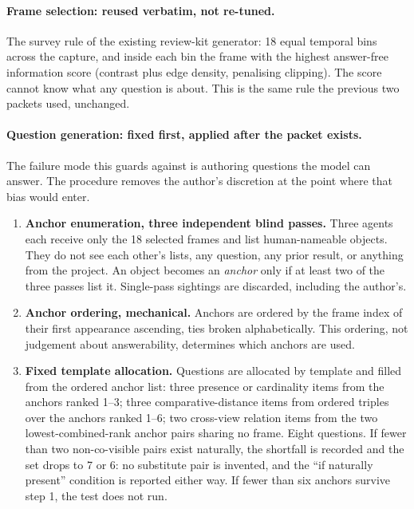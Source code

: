 \paragraph{Frame selection: reused verbatim, not re-tuned.} The survey
rule of the existing review-kit generator: 18 equal temporal bins across the
capture, and inside each bin the frame with the highest answer-free
information score (contrast plus edge density, penalising clipping). The
score cannot know what any question is about. This is the same rule the
previous two packets used, unchanged.

\paragraph{Question generation: fixed first, applied after the packet
exists.} The failure mode this guards against is authoring questions the
model can answer. The procedure removes the author's discretion at the point
where that bias would enter.

\begin{enumerate}
  \item \textbf{Anchor enumeration, three independent blind passes.} Three
  agents each receive only the 18 selected frames and list human-nameable
  objects. They do not see each other's lists, any question, any prior
  result, or anything from the project. An object becomes an \emph{anchor}
  only if at least two of the three passes list it. Single-pass sightings
  are discarded, including the author's.
  \item \textbf{Anchor ordering, mechanical.} Anchors are ordered by the
  frame index of their first appearance ascending, ties broken
  alphabetically. This ordering, not judgement about answerability,
  determines which anchors are used.
  \item \textbf{Fixed template allocation.} Questions are allocated by
  template and filled from the ordered anchor list: three presence or
  cardinality items from the anchors ranked 1--3; three comparative-distance
  items from ordered triples over the anchors ranked 1--6; two cross-view
  relation items from the two lowest-combined-rank anchor pairs sharing no
  frame. Eight questions. If fewer than two non-co-visible pairs exist
  naturally, the shortfall is recorded and the set drops to 7 or 6: no
  substitute pair is invented, and the ``if naturally present'' condition is
  reported either way. If fewer than six anchors survive step 1, the test
  does not run.
\end{enumerate}

